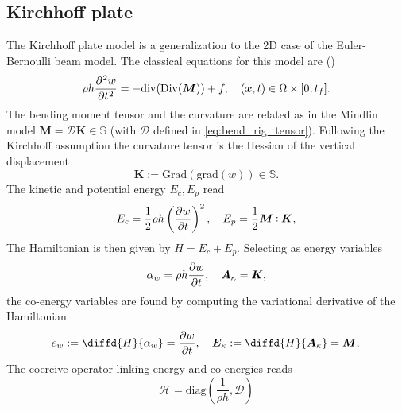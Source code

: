 \documentclass{ifacconf}
\def\onedot{$\mathsurround0pt\ldotp$}
\def\cddot{%
	\mathbin{\vcenter{\baselineskip.67ex
			\hbox{\onedot}\hbox{\onedot}}%
}}
\begin{document}
\subsection{Kirchhoff plate}
The Kirchhoff plate model is a generalization to the 2D case of the Euler-Bernoulli beam model. The classical equations for this model are (\cite{timoshenko1959theory}) 
\begin{equation}
\displaystyle \rho h \diffp[2]{w}{t} = -\mathrm{div}(\mathrm{Div}(\bm{M})) + f, \quad (\bm{x}, t) \in \Omega \times [0, t_f].
\end{equation}
The bending moment tensor and the curvature are related as in the Mindlin model $\bm{M} = \mathcal{D} \bm{K} \in \mathbb{S}$ (with $\mathcal{D}$ defined in \eqref{eq:bend_rig_tensor}). Following the Kirchhoff assumption the curvature tensor is the Hessian of the vertical displacement
\begin{equation*}
\bm{K} := \mathrm{Grad}(\mathrm{grad}(w)) \in \mathbb{S}.
\end{equation*}
 The kinetic and potential energy $E_c, E_p$ read
\begin{equation}
E_c =  \frac{1}{2}\rho h \left(\diffp{w}{t} \right)^2, \quad
E_p = \frac{1}{2} \bm{M} \cddot \bm{K},
\end{equation} 
The Hamiltonian is then given by $H=E_c + E_p$. Selecting as energy variables
\begin{equation}
\alpha_w = \rho h \diffp{w}{t}, \quad \bm{A}_{\kappa} = \bm{K}, 
\end{equation}
the co-energy variables are found by computing the variational derivative of the Hamiltonian
\begin{equation}
e_w := \diffd{H}{\alpha_w} = \diffp{w}{t}, \quad \bm{E}_{\kappa} := \diffd{H}{\bm{A}_{\kappa}} = \bm{M}, \\
\end{equation}
The coercive operator linking energy and co-energies reads
\begin{equation}
\mathcal{H} = \mathrm{diag}(\frac{1}{\rho h}, \mathcal{D})
\end{equation}
 
\end{document}
